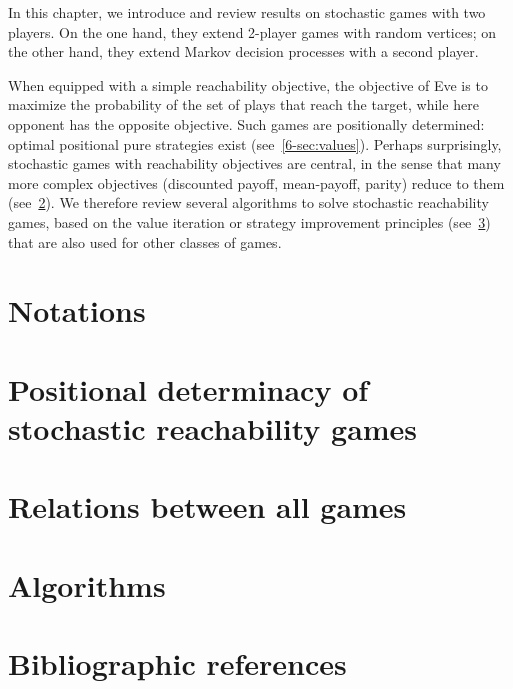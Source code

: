 

In this chapter, we introduce and review results on stochastic games
with two players. On the one hand, they extend 2-player games with
random vertices; on the other hand, they extend Markov decision
processes with a second player. 

When equipped with a simple reachability objective, the objective of
Eve is to maximize the probability of the set of plays that reach the
target, while here opponent has the opposite objective. Such games are
positionally determined: optimal positional pure strategies exist (see~\cref{6-sec:values}). 
Perhaps surprisingly, stochastic games
with reachability objectives are central, in the sense that many more
complex objectives (discounted payoff, mean-payoff, parity) reduce to
them (see~\cref{6-sec:relations}). We therefore review several
algorithms to solve stochastic reachability games, based on the value
iteration or strategy improvement principles (see~\cref{6-sec:algos}) that are also used for other classes of
games.

\section*{Notations}
\label{6-sec:notations}


\section{Positional determinacy of stochastic reachability games}
\label{6-sec:determinacy}


\section{Relations between all games}
\label{6-sec:relations}


\section{Algorithms}
\label{6-sec:algos}


\section*{Bibliographic references}
\label{6-sec:references}

